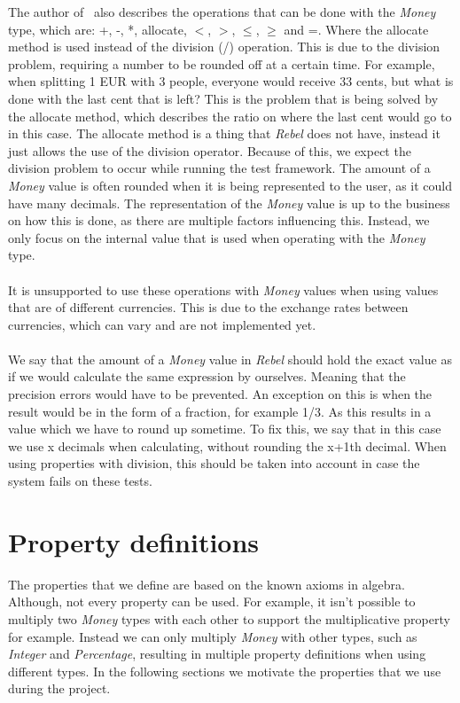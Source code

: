 The author of~\cite{fowler2002patterns} also describes the operations that can
be done with the \textit{Money} type, which are: +, -, *, allocate, $<$, $>$,
$\leq$, $\geq$ and =. Where the allocate method is used instead of the division (/) operation. This is due to the division problem, requiring a number to be rounded off at a certain time. For example, when splitting 1 EUR with 3 people, everyone would receive 33 cents, but what is done with the last cent that is left? This is the problem that is being solved by the allocate method, which describes the ratio  on where the last cent would go to in this case. The allocate method is a thing that \textit{Rebel} does not have, instead it just allows the use of the division operator. Because of this, we expect the division problem to occur while running the test framework. The amount of a \textit{Money} value is often rounded when it is being represented to the user, as it could have many decimals. The representation of the \textit{Money} value is up to the business on how this is done, as there are multiple factors influencing this. Instead, we only focus on the internal value that is used when operating with the \textit{Money} type.\\
\\
It is unsupported to use these operations with \textit{Money} values when using
values that are of different currencies. This is due to the exchange rates
between currencies, which can vary and are not implemented yet.\\
\\
We say that the amount of a \textit{Money} value in \textit{Rebel} should hold the exact value as if we would calculate the same expression by ourselves. Meaning that the precision errors would have to be prevented. An exception on this is when the result would be in the form of a fraction, for example 1/3. As this results in a value which we have to round up sometime. To fix this, we say that in this case we use x decimals when calculating, without rounding the x+1th decimal. When using properties with division, this should be taken into account in case the system fails on these tests. 

\section{Property definitions}
The properties that we define are based on the known axioms in algebra. Although, not every property can be used. For example, it isn't possible to multiply two \textit{Money} types with each other to support the multiplicative property for example. Instead we can only multiply \textit{Money} with other types, such as \textit{Integer} and \textit{Percentage}, resulting in multiple property definitions when using different types. In the following sections we motivate the properties that we use during the project.
